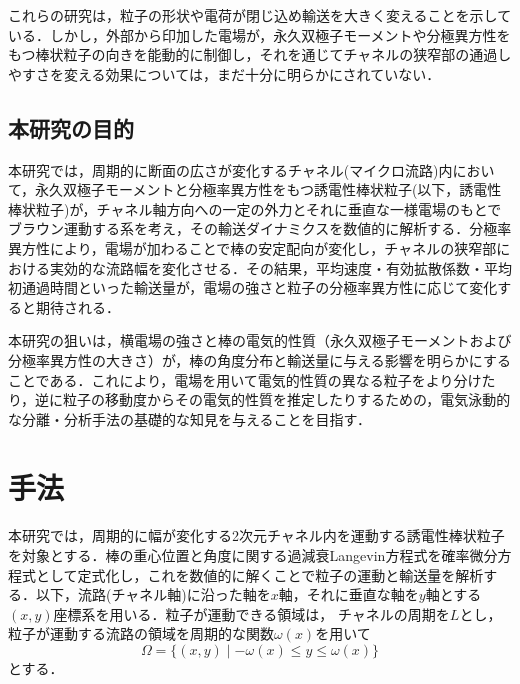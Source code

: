 \documentclass[dvipdfmx]{ampbt}
\begin{document}
  これらの研究は，粒子の形状や電荷が閉じ込め輸送を大きく変えることを示している．しかし，外部から印加した電場が，永久双極子モーメントや分極異方性をもつ棒状粒子の向きを能動的に制御し，それを通じてチャネルの狭窄部の通過しやすさを変える効果については，まだ十分に明らかにされていない．

  \subsection{本研究の目的}
  本研究では，周期的に断面の広さが変化するチャネル(マイクロ流路)内において，永久双極子モーメントと分極率異方性をもつ誘電性棒状粒子(以下，誘電性棒状粒子)が，チャネル軸方向への一定の外力とそれに垂直な一様電場のもとでブラウン運動する系を考え，その輸送ダイナミクスを数値的に解析する．分極率異方性により，電場が加わることで棒の安定配向が変化し，チャネルの狭窄部における実効的な流路幅を変化させる．その結果，平均速度・有効拡散係数・平均初通過時間といった輸送量が，電場の強さと粒子の分極率異方性に応じて変化すると期待される．

  本研究の狙いは，横電場の強さと棒の電気的性質（永久双極子モーメントおよび分極率異方性の大きさ）が，棒の角度分布と輸送量に与える影響を明らかにすることである．これにより，電場を用いて電気的性質の異なる粒子をより分けたり，逆に粒子の移動度からその電気的性質を推定したりするための，電気泳動的な分離・分析手法の基礎的な知見を与えることを目指す．

  \section{手法}
  本研究では，周期的に幅が変化する2次元チャネル内を運動する誘電性棒状粒子を対象とする．棒の重心位置と角度に関する過減衰Langevin方程式を確率微分方程式として定式化し，これを数値的に解くことで粒子の運動と輸送量を解析する．以下，流路(チャネル軸)に沿った軸を$x$軸，それに垂直な軸を$y$軸とする$(x,y)$座標系を用いる．粒子が運動できる領域は，
  チャネルの周期を$L$とし，粒子が運動する流路の領域を周期的な関数$\omega(x)$を用いて
  \begin{equation}
    \Omega=\{(x,y)\mid -\omega(x)\leq y\leq \omega(x)\}
  \end{equation}
  とする．
\end{document}
